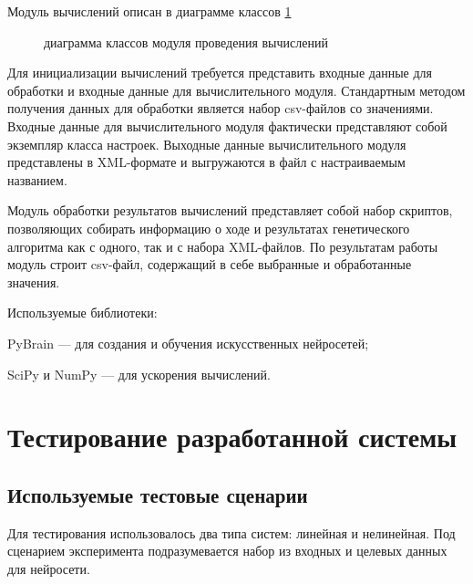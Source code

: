 \documentclass[utf8,usehyperref,14pt]{G7-32}
\begin{document}
Модуль вычислений описан в диаграмме классов \ref{class-diagram}
\begin{figure}[H]
  \caption{диаграмма классов модуля проведения вычислений}\label{class-diagram}
\end{figure}
Для инициализации вычислений требуется представить входные данные для обработки и входные данные для вычислительного модуля. Стандартным методом получения данных для обработки является набор csv-файлов со значениями. Входные данные для вычислительного модуля фактически представляют собой экземпляр класса настроек. Выходные данные вычислительного модуля представлены в XML-формате и выгружаются в файл с настраиваемым названием.

Модуль обработки результатов вычислений представляет собой набор скриптов, позволяющих собирать информацию о ходе и результатах генетического алгоритма как с одного, так и с набора XML-файлов. По результатам работы модуль строит csv-файл, содержащий в себе выбранные и обработанные значения.
 
\par{Используемые библиотеки:}
\par{PyBrain --- для создания и обучения искусственных нейросетей;}
\par{SciPy и NumPy --- для ускорения вычислений.} \cite{SciPy}

\chapter{Тестирование разработанной системы}
\section{Используемые тестовые сценарии}
Для тестирования использовалось два типа систем: линейная и нелинейная. Под сценарием эксперимента подразумевается набор из входных и целевых данных для нейросети. \cite{Neural_Networks}
\end{document}
